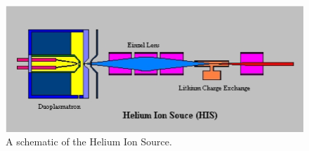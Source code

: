 \begin{figure}
    \centering
    \includegraphics[scale=0.75]{Setup_Figs/HIS.png}
    \caption{A schematic of the Helium Ion Source.}
    \label{fig:HIS}
\end{figure}